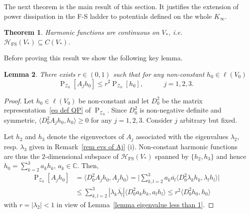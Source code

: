 \documentclass[11pt]{amsart}
\newtheorem{theorem}{Theorem}[section]
\newtheorem{lemma}[theorem]{Lemma}
\theoremstyle{definition}
\theoremstyle{remark}
\theoremstyle{example}
\numberwithin{equation}{section}
\providecommand{\pdf}[1]{\operatorname{P}_{#1}}
\begin{document}
The next theorem is the main result of this section. It justifies the extension of power dissipation in the F-S ladder to potentials defined on the whole $K_\infty$.

\begin{theorem}\label{thm harmonic cont}
Harmonic functions are continuous on $V_*$, i.e. ${\mathcal{H}}_\operatorname{FS}(V_*)\subseteq C(V_*)$.
\end{theorem}

Before proving this result we show the following key lemma.

\begin{lemma}\label{lem contract P_0}
There exists $r\in(0,1)$ such that for any non-constant $h_0\in\ell(V_0)$ 
\[
\pdf{{\mathcal{Z}}_0}[A_jh_0]\leq r^2\pdf{{\mathcal{Z}}_0}[h_0],\qquad\quad j=1,2,3.
\]
\end{lemma}
\begin{proof}
Let $h_0\in\ell(V_0)$ be non-constant and let $D^2_0$ be the matrix representation~\eqref{eq def QP} of $\pdf{{\mathcal{Z}}_0}$. Since $D^2_0$ is non-negative definite and symmetric, $\langle D^2_0A_jh_0,h_0\rangle\geq 0$ for any $j=1,2,3$. Consider $j$ arbitrary but fixed.

Let $h_2$ and $h_3$ denote the eigenvectors of $A_j$ associated with the eigenvalues $\lambda_2$, resp. $\lambda_3$ given in Remark~\ref{rem evs of Aj} (i). Non-constant harmonic functions are thus the $2$-dimensional subspace of ${\mathcal{H}}_\operatorname{FS}(V_*)$ spanned by $\{h_2,h_3\}$ and hence $h_0=\sum_{k=2}^3a_kh_k$, $a_k\in{{\mathbb C}}$. Then,
\begin{align*}
\pdf{{\mathcal{Z}}_0}[A_jh_0]&=\langle D^2_0A_jh_0,A_j h_0\rangle=\bigg|\sum_{k,l=2}^3a_k\overline{a_l}\langle D^2_0\lambda_kh_k,\lambda_lh_l\rangle\bigg|\\
&\leq \sum_{k,l=2}^3|\lambda_k\overline{\lambda_l}|\langle D^2_0a_kh_k,a_lh_l\rangle\leq r^2\langle D^2_0h_0,h_0\rangle
\end{align*}
with $r=|\lambda_2|<1$ in view of Lemma~\ref{lemma eigenvalue less than 1}.
\end{proof}
\end{document}
